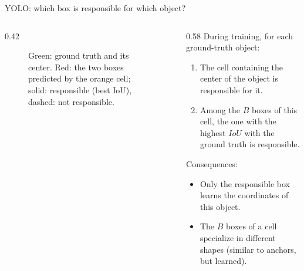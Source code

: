 \documentclass[xcolor=pdftex,dvipsnames,table]{beamer}
\begin{document}
\begin{frame}{YOLO: which box is responsible for which object?}
\begin{columns}[c]
\begin{column}{0.42\textwidth}
\begin{figure}[htb]
\centering
{}
\caption{\scriptsize Green: ground truth and its center. Red: the two boxes predicted by the orange cell; solid: responsible (best IoU), dashed: not responsible.}
\end{figure}
\end{column}
\begin{column}{0.58\textwidth}
\small
During training, for each ground-truth object:
\begin{enumerate}
   \item The cell containing the center of the object is responsible for it.
   \item Among the $B$ boxes of this cell, the one with the highest $IoU$ with the ground truth is responsible.
\end{enumerate}
\vspace{.2cm}
Consequences:
\begin{itemize}
   \item Only the responsible box learns the coordinates of this object.
   \item The $B$ boxes of a cell specialize in different shapes (similar to anchors, but learned).
\end{itemize}
\end{column}
\end{columns}
\end{frame}
\end{document}
